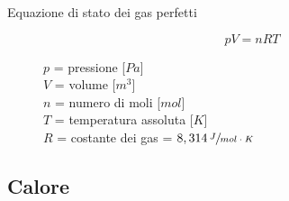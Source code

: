 \documentclass[a4paper,11pt,italian]{article}
\begin{document}
\begin{description}
  \item[Equazione di stato dei gas perfetti]
  \[ pV = nRT \]
  \begin{multicols}{2}
  $ p $ = pressione [$ Pa $]\\
  $ V $ = volume [$ m^3 $]\\
  $ n $ = numero di moli [$ mol $]\\
  $ T $ = temperatura assoluta [$ K $]\\
  $ R $ = costante dei gas = $ 8,314 \, \sfrac{J}{mol \cdot K} $
  \end{multicols}
\end{description}

\subsection{Calore}
\end{document}
